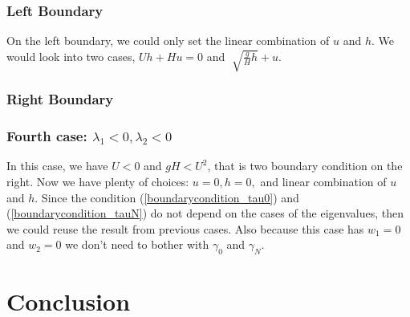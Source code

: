 \documentclass{article}
\theoremstyle{definition}
\begin{document}
    \subsubsection*{Left Boundary}
    On the left boundary, we could only set the linear combination of $u$ and $h$. We would 
    look into two cases, $Uh + Hu =0$ and $\sqrt[]{\frac{g}{H}h}+u$. 

    \subsubsection*{Right Boundary}


    
    \subsubsection{Fourth case: $\lambda_1 <0, \lambda_2 <0$}
    In this case, we have $U<0$ and $gH < U^2$, that is two boundary condition on the right. 
    Now we have plenty of choices: $u=0, h=0,$ and linear combination of $u$ and $h$. 
    Since the condition (\ref{boundarycondition_tau0}) and (\ref{boundarycondition_tauN})
    do not depend on the cases of the eigenvalues, then we could reuse the result 
    from previous cases. 
    Also because this case has $w_1 = 0$ and $w_2 =0$ we don't need to bother with 
    $\gamma_0$ and $\gamma_N$.


\section{Conclusion}
\end{document}
